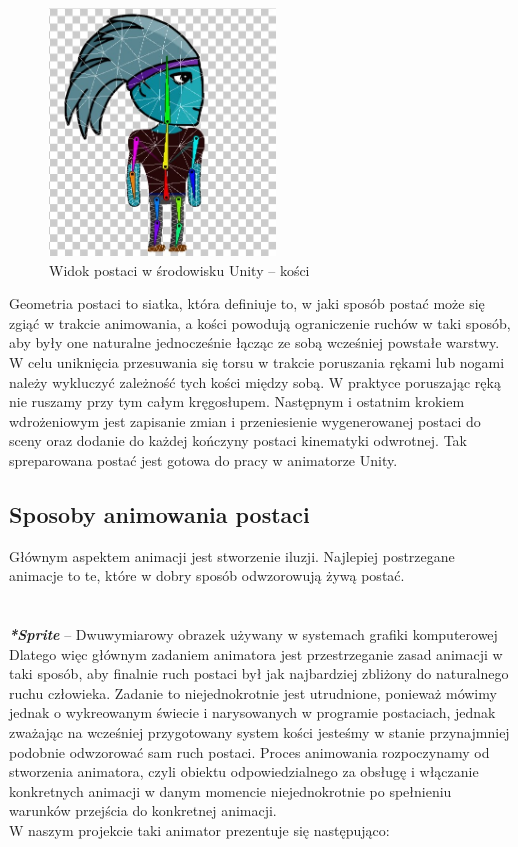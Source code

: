 \documentclass[oneside,polski,logo]{amuthesis}
\begin{document}
\begin{figure}[h]
	\centering
	\includegraphics[width=6cm]{images/kozubal/bones.jpg}
	\caption{Widok postaci w środowisku Unity – kości}
\end{figure}

Geometria postaci to siatka, która definiuje to, w jaki sposób postać może się zgiąć w trakcie animowania, a kości powodują ograniczenie ruchów w taki sposób, aby były one naturalne jednocześnie łącząc ze sobą wcześniej powstałe warstwy. W celu uniknięcia przesuwania się torsu w trakcie poruszania rękami lub nogami należy wykluczyć zależność tych kości między sobą. W praktyce poruszając ręką nie ruszamy przy tym całym kręgosłupem.
Następnym i ostatnim krokiem wdrożeniowym jest zapisanie zmian i przeniesienie wygenerowanej postaci do sceny oraz dodanie do każdej kończyny postaci kinematyki odwrotnej. Tak spreparowana postać jest gotowa do pracy w animatorze Unity.


\subsection{Sposoby animowania postaci}
Głównym aspektem animacji jest stworzenie iluzji. Najlepiej postrzegane animacje to te, które w dobry sposób odwzorowują żywą postać.\\
\noindent\makebox[\linewidth]{\rule{15cm}{0.4pt}}\\
\\
\textbf{\textit{*Sprite}} – Dwuwymiarowy obrazek używany w systemach grafiki komputerowej \newpage
Dlatego więc głównym zadaniem animatora jest przestrzeganie zasad animacji w taki sposób, aby finalnie ruch postaci był jak najbardziej zbliżony do naturalnego ruchu człowieka.
 Zadanie to niejednokrotnie jest utrudnione, ponieważ mówimy jednak o wykreowanym świecie i narysowanych w programie postaciach, jednak zważając na wcześniej przygotowany system kości jesteśmy w stanie przynajmniej podobnie odwzorować sam ruch postaci. 
Proces animowania rozpoczynamy od stworzenia animatora, czyli obiektu odpowiedzialnego za obsługę i włączanie konkretnych animacji w danym momencie niejednokrotnie po spełnieniu warunków przejścia do konkretnej animacji. \cite{animation1} \\
W naszym projekcie taki animator prezentuje się następująco:
\end{document}
